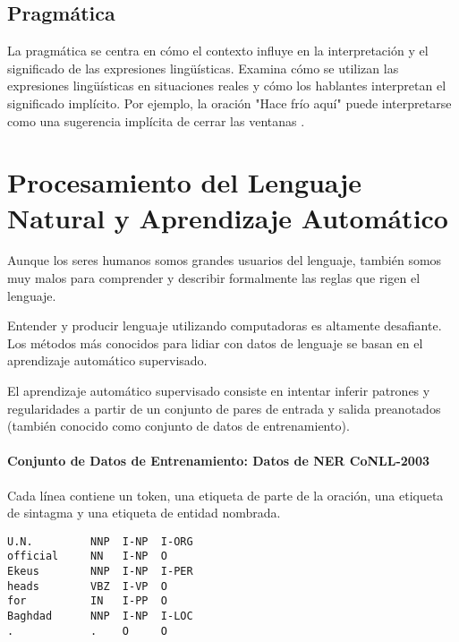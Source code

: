 \documentclass{book}
\begin{document}
\subsection{Pragmática}

La pragmática se centra en cómo el contexto influye en la interpretación y el significado de las expresiones lingüísticas. Examina cómo se utilizan las expresiones lingüísticas en situaciones reales y cómo los hablantes interpretan el significado implícito. Por ejemplo, la oración "Hace frío aquí" puede interpretarse como una sugerencia implícita de cerrar las ventanas \cite{fromkin2018introduction}.


\section{Procesamiento del Lenguaje Natural y Aprendizaje Automático}

Aunque los seres humanos somos grandes usuarios del lenguaje, también somos muy malos para comprender y describir formalmente las reglas que rigen el lenguaje.

Entender y producir lenguaje utilizando computadoras es altamente desafiante. Los métodos más conocidos para lidiar con datos de lenguaje se basan en el aprendizaje automático supervisado.

El aprendizaje automático supervisado consiste en intentar inferir patrones y regularidades a partir de un conjunto de pares de entrada y salida preanotados (también conocido como conjunto de datos de entrenamiento).

\paragraph{Conjunto de Datos de Entrenamiento: Datos de NER CoNLL-2003}

Cada línea contiene un token, una etiqueta de parte de la oración, una etiqueta de sintagma y una etiqueta de entidad nombrada.
\begin{center}
\begin{verbatim}
U.N.         NNP  I-NP  I-ORG
official     NN   I-NP  O
Ekeus        NNP  I-NP  I-PER
heads        VBZ  I-VP  O
for          IN   I-PP  O
Baghdad      NNP  I-NP  I-LOC
.            .    O     O
\end{verbatim}
\end{center}

\end{document}
